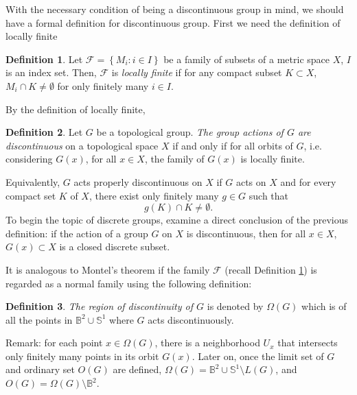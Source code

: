 \documentclass[12pt,oneside]{sfsuthesis}
\theoremstyle{plain} %
\theoremstyle{definition}  %
\newtheorem{definition}{Definition}[chapter]
\theoremstyle{remark}  %
\theoremstyle{plain}
\begin{document}
{With the necessary condition of being a discontinuous group in mind, we should have a formal definition for discontinuous group\cite{katok1992fuchsian, ratcliffe1994foundations, cano2013complex}. First we need the definition of locally finite
\begin{definition}\label{normal family}
Let $\mathcal{F}=\left\lbrace M_i:i\in I\right\rbrace$ be a family of subsets of a metric space $X$, $I$ is an index set. Then, $\mathcal{F}$ is \textit{locally finite} if for any compact subset $K\subset X$, $M_i\cap K\neq\emptyset$ for only finitely many $i\in I$.
\end{definition}
By the definition of locally finite, 
\begin{definition}
Let $G$ be a topological group. \textit{The group actions of $G$ are discontinuous} on a topological space $X$ if and only if for all orbits of $G$, i.e. considering $G(x)$, for all $x\in X$, the family of $G(x)$ is locally finite.
\end{definition}
Equivalently, $G$ acts properly discontinuous on $X$ if $G$ acts on $X$ and for every compact set $K$ of $X$, there exist only finitely many $g\in G$ such that
$$
g(K)\cap K\neq \emptyset.
$$
To begin the topic of discrete groups, examine a direct conclusion of the previous definition: if the action of a group $G$ on $X$ is discontinuous, then for all $x\in X$, $G(x)\subset X$ is a closed discrete subset. 

It is analogous to Montel's theorem if the family $\mathcal{F}$ (recall Definition \ref{normal family}) is regarded as a normal family using the following definition:
\begin{definition}
\textit{The region of discontinuity of $G$} is denoted by $\Omega(G)$ which is of all the points in $\mathbb{B}^{2}\cup\mathbb{S}^{1}$ where $G$ acts discontinuously.
\end{definition}
Remark: for each point $x\in\Omega(G)$, there is a neighborhood $U_x$ that intersects only finitely many points in its orbit $G(x)$. Later on, once the limit set of $G$ and ordinary set $O(G)$ are defined, $\Omega(G)=\mathbb{B}^{2}\cup\mathbb{S}^{1}\setminus L(G)$, and $O(G)=\Omega(G)\setminus \mathbb{B}^{2}$.

}
\end{document}
